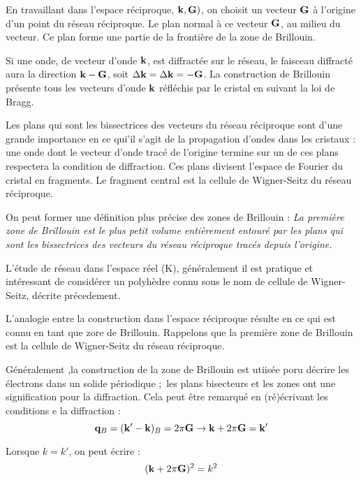 En travaillant dans l'espace réciproque, $\mathbf{k},\mathbf{G})$, on choisit un
vecteur $\mathbf{G}$ à l'origine d'un point du réseau réciproque. Le plan normal
à ce vecteur $\mathbf{G}$, au milieu du vecteur. Ce plan forme une partie de la
frontière de la zone de Brillouin.

Si une onde, de vecteur d'onde $\mathbf{k}$, est diffractée sur le réseau, le
faisceau diffracté aura la direction $\mathbf{k}-\mathbf{G}$, soit $\Delta\mathbf{k} = \Delta\mathbf{k} = -\mathbf{G}$.
La construction de Brillouin présente tous les vecteurs d'onde $\mathbf{k}$
réfléchis par le cristal en suivant la loi de Bragg.

Les plans qui sont les bissectrices des vecteurs du réseau réciproque sont d'une
grande importance en ce qui'il s'agit de la propagation d'ondes dans les
cristaux : une onde dont le vecteur d'onde tracé de l'origine termine sur un
de ces plans respectera la condition de diffraction. Ces plans divisent l'espace
de Fourier du cristal en fragments. Le fragment central est la cellule de
Wigner-Seitz du réseau réciproque.

On peut former une définition plus précise des zones de Brillouin : \emph{
    La première zone de Brillouin est le plus petit volume entièrement entouré
    par les plans qui sont les bissectrices des vecteurs du réseau réciproque
tracés depuis l'origine.}




L'étude de réseau dans l'espace réel (K), généralement il est pratique et
intéressant de considérer un polyhèdre connu sous le nom de cellule de
Wigner-Seitz, décrite précedement.

L'analogie entre la construction dans l'espace réciproque résulte en ce qui est
connu en tant que zore de Brillouin. Rappelons que la première zone de Brillouin
est la cellule de Wigner-Seitz du réseau réciproque.

Généralement ,la construction de la zone de Brillouin est utiisée poru décrire
les électrons dans un solide périodique ; les plans bisecteurs et les
zones ont une signification pour la diffraction. Cela peut être remarqué en
(ré)écrivant les conditions e la diffraction :
\begin{equation}
    \mathbf{q}_B = (\mathbf{k'-k})_B = 2\pi\mathbf{G} \rightarrow \mathbf{k} + 2\pi \mathbf{G} = \mathbf{k'}
\end{equation}

Lorsque $k=k'$, on peut écrire :
\begin{equation}
    (\mathbf{k} + 2\pi \mathbf{G})^2 = k^2
\end{equation}

